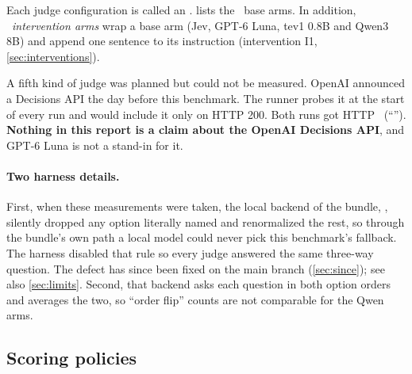Each judge configuration is called an .  lists the \NumBase\ base arms.
In addition, \NumClauseArms\ \emph{intervention arms} wrap a base arm (Jev, GPT-6 Luna, tev1 0.8B and
Qwen3 8B) and append one sentence to its instruction (intervention I1, \cref{sec:interventions}).

\begin{table}[htbp]
\centering\small
\caption{The \NumBase\ base judges. ``Self-reported'' means the model writes its probabilities as text in
a structured answer; they are not the model's internal token probabilities. Local judges have no API
charge; hardware, electricity and memory are not priced.}
\label{tab:arms}

\end{table}

A fifth kind of judge was planned but could not be measured. OpenAI announced a Decisions API the day
before this benchmark. The runner probes it at the start of every run and would include it only on
HTTP 200. Both runs got HTTP \HoldProbeStatus\ (``\HoldProbeMessage''). \textbf{Nothing in this report
is a claim about the OpenAI Decisions API}, and GPT-6 Luna is not a stand-in for it.

\paragraph{Two harness details.} First, when these measurements were taken, the local backend of the
bundle, , silently dropped any option literally named  and renormalized the
rest, so through the bundle's own path a local model could never pick this benchmark's fallback. The
harness disabled that rule so every judge answered the same three-way question. The defect has since
been fixed on the main branch (\cref{sec:since}); see also \cref{sec:limits}. Second, that backend asks each question in both option orders and averages the two,
so ``order flip'' counts are not comparable for the Qwen arms.

\subsection{Scoring policies}


